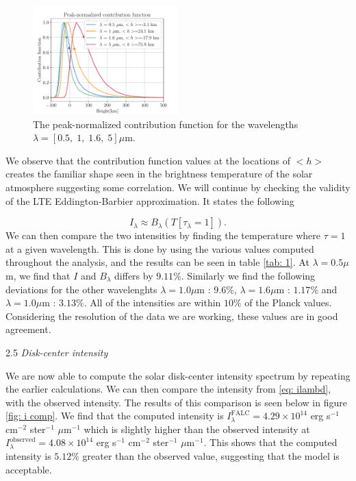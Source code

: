 \documentclass[a4paper,11.5pt,]{article}
\begin{document}
\begin{multicols}{2}

\begin{figure}[H]
    \centering
    \includegraphics[width = 0.5\textwidth]{figures/2.4/contfunc.pdf}
    \caption{The peak-normalized contribution function for the wavelengths $\lambda = [0.5,\; 1,\; 1.6,\; 5]\mu$m.}
    \label{fig: cont comp}
\end{figure}

We observe that the contribution function values at the locations of $< h >$ creates the familiar shape seen in the brightness temperature of the solar atmosphere suggesting some correlation. We will continue by checking the validity of the LTE Eddington-Barbier approximation. It states the following

\begin{equation}\label{eq: barb}
    I _ { \lambda } \approx B _ { \lambda } \left( T \left[ \tau _ { \lambda } = 1 \right] \right).
\end{equation}
We can then compare the two intensities by finding the temperature where $\tau = 1$ at a given wavelength. This is done by using the various values computed throughout the analysis, and the results can be seen in table \ref{tab: 1}. At $\lambda = 0.5 \mu$m, we find that $I$ and $B_\lambda$ differs by $9.11\%$. Similarly we find the following deviations for the other wavelenghts $\lambda = 1.0 \mu$m : $9.6\%$, $\lambda = 1.6 \mu$m : $1.17\%$ and $\lambda = 1.0 \mu$m : $3.13\%$. All of the intensities are within $10\%$ of the Planck values. Considering the resolution of the data we are working, these values are in good agreement. 

 \begin{center}
2.5 \textit{Disk-center intensity}
\end{center}
We are now able to compute the solar disk-center intensity spectrum by repeating the earlier calculations. We can then compare the intensity from \eqref{eq: ilambd}, with the observed intensity. The results of this comparison is seen below in figure \ref{fig: i comp}. We find that the computed intensity is $I_\lambda^\mathrm{FALC} = 4.29 \times 10^{14}$ erg s$^{-1}$ cm$^{-2}$ ster$^{-1}$ $\mu$m$^{-1}$ which is slightly higher than the observed intensity at $I_\lambda^\mathrm{observed} = 4.08 \times 10^{14}$ erg s$^{-1}$ cm$^{-2}$ ster$^{-1}$ $\mu$m$^{-1}$. This shows that the computed intensity is $5.12\%$ greater than the observed value, suggesting that the model is acceptable. 


\end{multicols}
\end{document}
